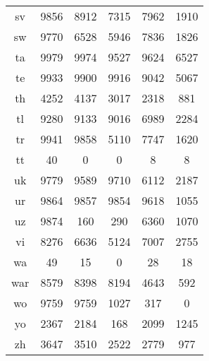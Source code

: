 \begin{figure}[h]
\begin{tabular}{cccccc}
sv&9856&8912&7315&7962&1910\\
sw&9770&6528&5946&7836&1826\\
ta&9979&9974&9527&9624&6527\\
te&9933&9900&9916&9042&5067\\
th&4252&4137&3017&2318&881\\
tl&9280&9133&9016&6989&2284\\
tr&9941&9858&5110&7747&1620\\
tt&40&0&0&8&8\\
uk&9779&9589&9710&6112&2187\\
ur&9864&9857&9854&9618&1055\\
uz&9874&160&290&6360&1070\\
vi&8276&6636&5124&7007&2755\\
wa&49&15&0&28&18\\
war&8579&8398&8194&4643&592\\
wo&9759&9759&1027&317&0\\
yo&2367&2184&168&2099&1245\\
zh&3647&3510&2522&2779&977\\
\hline\hline
\end{tabular}
\end{figure}
